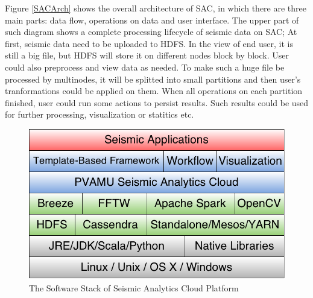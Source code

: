 
Figure \ref{SACArch} shows the overall architecture of SAC, in which there are three main parts: data flow, operations on data and user interface.
The upper part of such diagram shows a complete processing lifecycle of seismic data on SAC; At first, seismic data need to be uploaded to HDFS. In the view of end user, it is still a big file, but HDFS will store it on different nodes block by block. User could also preprocess and view data as needed. To make such a huge file be processed by multi\-nodes, it will be splitted into small partitions and then user's tranformations could be applied on them. When all operations on each partition finished, user could run some actions to persist results. Such results could be used for further processing, visualization or statitics etc.  


\begin{figure}[H]
\centering
\includegraphics[scale=.50]{figures/SACSWStack.png}
\caption{The Software Stack of Seismic Analytics Cloud Platform}
\label{SACSWStack}
\end{figure}


